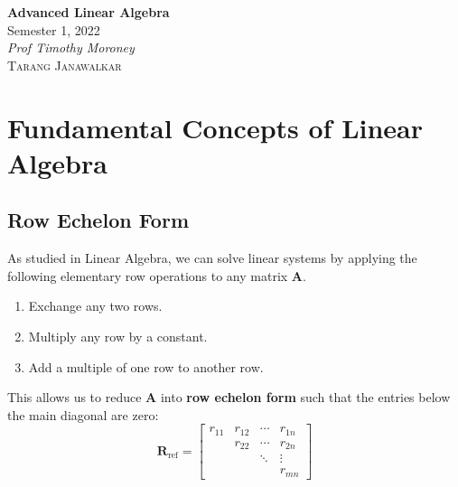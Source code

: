 \documentclass{article}
\date{}
\newcommand{\unitName}{Advanced Linear Algebra}
\newcommand{\unitTime}{Semester 1, 2022}
\newcommand{\unitCoordinator}{Prof Timothy Moroney}
\newcommand{\documentAuthors}{\textsc{Tarang Janawalkar}}
\begin{document}
%
\begin{titlepage}
    \vspace*{\fill}
    \begin{center}
        \LARGE{\textbf{\unitName}} \\[0.1in]
        \normalsize{\unitTime} \\[0.2in]
        \normalsize\textit{\unitCoordinator} \\[0.2in]
        \documentAuthors
    \end{center}
    \vspace*{\fill}
    \doclicenseThis
    \thispagestyle{empty}
\end{titlepage}
\newpage
%
\tableofcontents
\newpage
%
\section{Fundamental Concepts of Linear Algebra}
\subsection{Row Echelon Form}
As studied in Linear Algebra, we can solve linear systems by
applying the following elementary row operations to any matrix \(\symbf{A}\).
\begin{enumerate}[label=Type \Roman*.]
    \item Exchange any two rows.
    \item Multiply any row by a constant.
    \item Add a multiple of one row to another row.
\end{enumerate}
This allows us to reduce \(\symbf{A}\) into \textbf{row echelon form}
such that the entries below the main diagonal are zero:
\begin{equation*}
    \symbf{R}_{\mathrm{ref}} =
    \begin{bmatrix}
        r_{11} & r_{12} & \cdots & r_{1n} \\
               & r_{22} & \cdots & r_{2n} \\
               &        & \ddots & \vdots \\
               &        &        & r_{mn}
    \end{bmatrix}
\end{equation*}
\end{document}
